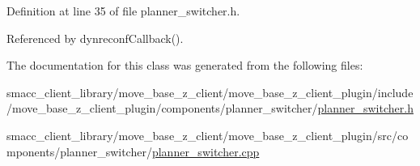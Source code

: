 Definition at line 35 of file planner\+\_\+switcher.\+h.



Referenced by dynreconf\+Callback().



The documentation for this class was generated from the following files\+:\begin{DoxyCompactItemize}
\item 
smacc\+\_\+client\+\_\+library/move\+\_\+base\+\_\+z\+\_\+client/move\+\_\+base\+\_\+z\+\_\+client\+\_\+plugin/include/move\+\_\+base\+\_\+z\+\_\+client\+\_\+plugin/components/planner\+\_\+switcher/\hyperlink{planner__switcher_8h}{planner\+\_\+switcher.\+h}\item 
smacc\+\_\+client\+\_\+library/move\+\_\+base\+\_\+z\+\_\+client/move\+\_\+base\+\_\+z\+\_\+client\+\_\+plugin/src/components/planner\+\_\+switcher/\hyperlink{planner__switcher_8cpp}{planner\+\_\+switcher.\+cpp}\end{DoxyCompactItemize}
